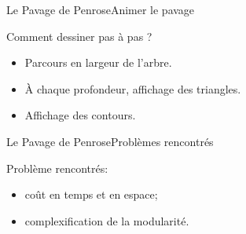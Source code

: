 \documentclass[11pt]{beamer}
\begin{document}
\begin{frame}{Le Pavage de Penrose}{Animer le pavage}
  \begin{block}{Comment dessiner pas à pas ?}
    \begin{itemize}
        \item Parcours en largeur de l'arbre.
        \item À chaque profondeur, affichage des triangles.
        \item Affichage des contours.
    \end{itemize}
  \end{block}
\end{frame}

\begin{frame}{Le Pavage de Penrose}{Problèmes rencontrés}
  \begin{block}{Problème rencontrés:}
    \begin{itemize}
      \item coût en temps et en espace;
      \item complexification de la modularité.
    \end{itemize}
  \end{block}
\end{frame}
\end{document}
